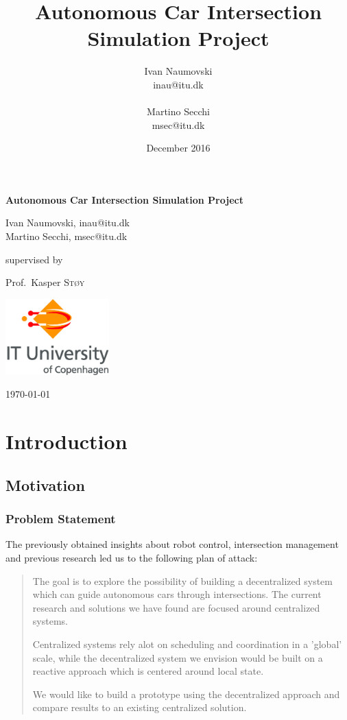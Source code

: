 \documentclass[titlepage]{article}
\title{Autonomous Car Intersection Simulation Project}
\author{
   Ivan Naumovski\\
    {inau@itu.dk}\\
    \\
   Martino Secchi\\
    {msec@itu.dk}\\
}
\date{December 2016}
\begin{document}
\begin{titlepage}
	\centering

	{\huge\bfseries Autonomous Car Intersection Simulation Project \par}
	\vspace{2cm}
	{\Large Ivan Naumovski, {inau@itu.dk}\\ Martino Secchi, {msec@itu.dk}\\\par}
	\vfill
	supervised by\par
	\large Prof.~Kasper \textsc{St\o y}

	\vfill
	\includegraphics[width=0.3\textwidth]{img/itulogo.jpg}\par\vspace{1cm}
	{\large \today\par}
\end{titlepage}

\clearpage
\tableofcontents
\clearpage


\abstract{

}
\section{Introduction}


\subsection{Motivation}


\subsubsection{Problem Statement}
The previously obtained insights about robot control, intersection management and previous research led us to the following plan of attack:

\begin{quotation}
The goal is to explore the possibility of building a decentralized system which can guide autonomous cars through intersections. 
The current research and solutions we have found are focused around centralized systems. 

Centralized systems rely alot on scheduling and coordination in a 'global' scale, 
while the decentralized system we envision would be built on a reactive approach which is centered around local state. 

We would like to build a prototype using the decentralized approach and compare results to an existing centralized solution.
\end{quotation}
\end{document}
